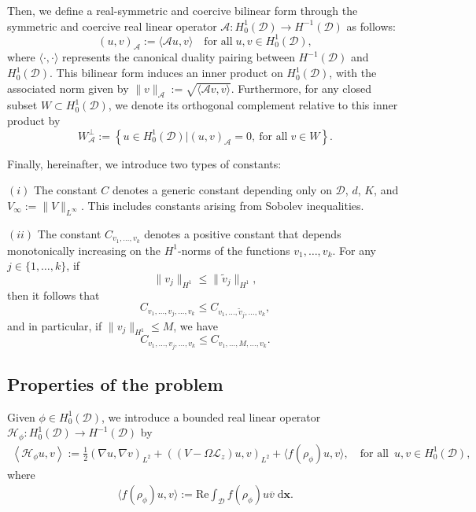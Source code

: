 \documentclass[preprint,3p]{elsarticle}
\begin{document}
Then, we define a real-symmetric and coercive bilinear form through the symmetric and coercive real linear operator $\mathcal{A}:H_0^1(\mathcal{D})\to H^{-1}(\mathcal{D})$ as follows:
\begin{equation}\label{Bilinear-operator}
	(u,v)_{\mathcal{A}} := \big\langle \mathcal{A}u, v \big\rangle \quad \text{for all}\; u,v \in H_0^1(\mathcal{D}),
\end{equation}
where $\langle\cdot,\cdot\rangle$ represents the canonical duality pairing between $H^{-1}(\mathcal{D})$ and $H_0^1(\mathcal{D})$. This bilinear form induces an inner product on $H_0^1(\mathcal{D})$, with the associated norm given by $\|v\|_{\mathcal{A}} := \sqrt{\langle\mathcal{A}v, v\rangle}$. Furthermore, for any closed subset $W \subset H_0^1(\mathcal{D})$, we denote its orthogonal complement relative to this inner product by
\begin{equation}\label{Orth-Comp}
	W^{\bot}_{\mathcal{A}} := \left\{ u \in H_0^1(\mathcal{D}) \big| (u,v)_{\mathcal{A}} = 0, \ {\text{for all}}\; v \in W \right\}.
\end{equation}

Finally, hereinafter, we introduce two types of constants:

\noindent $(i)$ {The constant} $ C $ denotes a generic constant depending only on $ \mathcal{D} $, $ d $, $ K $, and  $V_{\infty}:=\|V\|_{L^{\infty}}$. This includes constants arising from Sobolev inequalities.

\noindent $(ii)$ {The constant} $ C_{v_1,\dots, v_k} $ denotes a positive constant that depends monotonically increasing on the $ H^1$-norms of the functions $ v_1,\dots, v_k $. For any $j \in \{1,\dots,k\}$, if
\begin{equation}
	\|v_{j}\|_{H^1} \leq \|\widetilde{v}_{j}\|_{H^1},
\end{equation}
then it follows that
\begin{equation}
	C_{v_1,\dots, v_{j},\dots, v_k} \leq C_{v_1,\dots, \widetilde{v}_{j},\dots, v_k},
\end{equation}
and in particular, if $\|v_j\|_{H^1} \leq M$, we have
\begin{equation}
	C_{v_1,\dots, v_j,\dots, v_k} \leq C_{v_1,\dots, M,\dots, v_k}.
\end{equation}


\subsection{Properties of the problem}
Given $\phi\in H_0^1(\mathcal{D})$, we introduce a bounded real linear operator $\mathcal{H}_{\phi}:H_0^1(\mathcal{D})\to H^{-1}(\mathcal{D})$ by 
\begin{align}
	\left\langle\mathcal{H}_{\phi}u,v\right\rangle:=\frac{1}{2}\left(\nabla u,\nabla v\right)_{L^2}+\left(\left(V -\Omega\mathcal{L}_z\right)u,v\right)_{L^2}+\big\langle f(\rho_{\phi})u,v\big\rangle,\quad{\text{for all}}\;\ u,v \in H_0^1(\mathcal{D}),
\end{align}
where
\begin{align*}
	\big\langle f(\rho_{\phi})u,v\big\rangle:=\text{Re}\int_{\mathcal{D}}f(\rho_{\phi})u\overline{v}\;\text{d}\bm{x}.
\end{align*}
\end{document}
